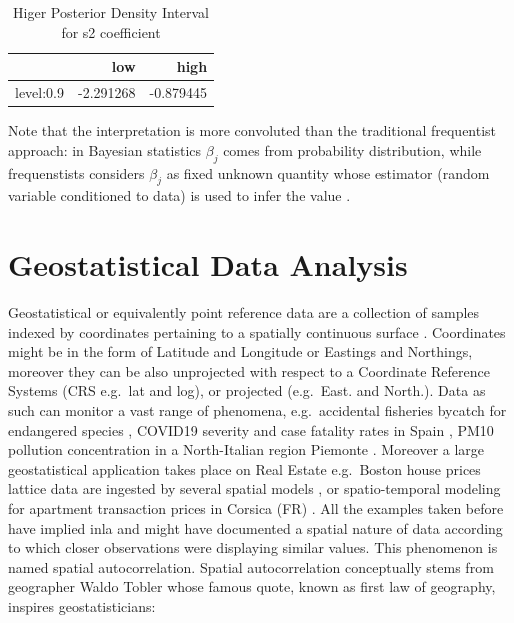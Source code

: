 \documentclass[
  12pt,
  a4paper,
  oneside]{book}
\theoremstyle{definition}
\theoremstyle{definition}
\theoremstyle{definition}
\theoremstyle{remark}
\begin{document}
\begin{table}

\caption{\label{tab:higerPosteriorDensityInterval}Higer Posterior Density Interval for s2 coefficient}
\centering
\begin{tabular}[t]{lrr}
\toprule
  & low & high\\
\midrule
level:0.9 & -2.291268 & -0.879445\\
\bottomrule
\end{tabular}
\end{table}

Note that the interpretation is more convoluted \citeyearpar{wang2018bayesian} than the traditional frequentist approach: in Bayesian statistics \(\beta_{j}\) comes from probability distribution, while frequenstists considers \(\beta_{j}\) as fixed unknown quantity whose estimator (random variable conditioned to data) is used to infer the value \citeyearpar{Blangiardo-Cameletti}.

\hypertarget{prdm}{%
\chapter{Geostatistical Data Analysis}\label{prdm}}

Geostatistical or equivalently point reference data are a collection of samples indexed by coordinates pertaining to a spatially continuous surface \citep{Moraga2019}. Coordinates might be in the form of Latitude and Longitude or Eastings and Northings, moreover they can be also unprojected with respect to a Coordinate Reference Systems (CRS e.g.~lat and log), or projected (e.g.~East. and North.). Data as such can monitor a vast range of phenomena, e.g.~accidental fisheries bycatch for endangered species \citep{CosandeyGodin2015}, COVID19 severity and case fatality rates in Spain \citep{Moragacovid2020}, PM10 pollution concentration in a North-Italian region Piemonte \citep{Cameletti2012}. Moreover a large geostatistical application takes place on Real Estate e.g.~Boston house prices lattice data \citep{mass} are ingested by several spatial models \citep{rubiorealestate}, or spatio-temporal modeling for apartment transaction prices in Corsica (FR) \citep{Ling}. All the examples taken before have implied inla and might have documented a spatial nature of data according to which closer observations were displaying similar values. This phenomenon is named spatial autocorrelation. Spatial autocorrelation conceptually stems from geographer Waldo Tobler whose famous quote, known as first law of geography, inspires geostatisticians:
\end{document}
